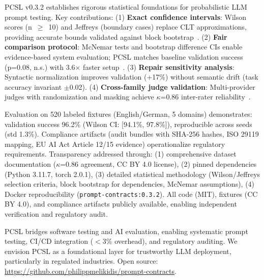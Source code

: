 \documentclass[sigconf]{acmart}
\begin{document}
PCSL v0.3.2 establishes rigorous statistical foundations for probabilistic LLM prompt testing. Key contributions: (1) \textbf{Exact confidence intervals}: Wilson scores (n~\(\geq\)~10) and Jeffreys (boundary cases) replace CLT approximations, providing accurate bounds validated against block bootstrap~\cite{brown2001interval,kunsch1989jackknife}. (2) \textbf{Fair comparison protocol}: McNemar tests and bootstrap difference CIs enable evidence-based system evaluation; PCSL matches baseline validation success (p=0.08, n.s.) with 3.6\(\times\) faster setup~\cite{mcnemar1947note}. (3) \textbf{Repair sensitivity analysis}: Syntactic normalization improves validation (+17\%) without semantic drift (task accuracy invariant \(\pm\)0.02). (4) \textbf{Cross-family judge validation}: Multi-provider judges with randomization and masking achieve \(\kappa\)=0.86 inter-rater reliability~\cite{landis1977measurement}.

Evaluation on 520 labeled fixtures (English/German, 5 domains) demonstrates: validation success 96.2\% (Wilson CI: [94.1\%, 97.8\%]), reproducible across seeds (std 1.3\%). Compliance artifacts (audit bundles with SHA-256 hashes, ISO 29119 mapping, EU AI Act Article 12/15 evidence) operationalize regulatory requirements. Transparency addressed through: (1) comprehensive dataset documentation (\(\kappa\)=0.86 agreement, CC BY 4.0 license), (2) pinned dependencies (Python 3.11.7, torch 2.0.1), (3) detailed statistical methodology (Wilson/Jeffreys selection criteria, block bootstrap for dependencies, McNemar assumptions), (4) Docker reproducibility (\texttt{prompt-contracts:0.3.2}). All code (MIT), fixtures (CC BY 4.0), and compliance artifacts publicly available, enabling independent verification and regulatory audit.

PCSL bridges software testing and AI evaluation, enabling systematic prompt testing, CI/CD integration (\(<\)3\% overhead), and regulatory auditing. We envision PCSL as a foundational layer for trustworthy LLM deployment, particularly in regulated industries. Open source: \url{https://github.com/philippmelikidis/prompt-contracts}.



\end{document}

